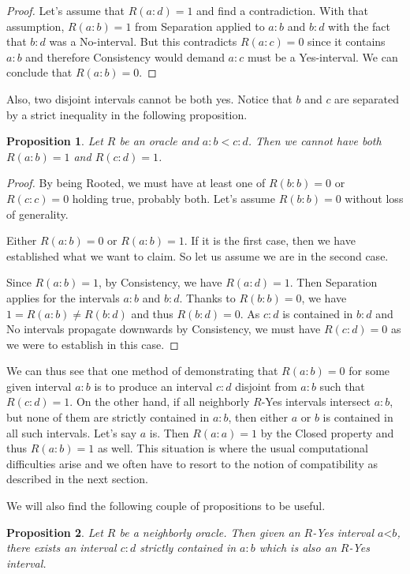 \documentclass[12pt]{article}
\newtheorem{proposition}{Proposition}
\theoremstyle{remark}
\newcommand{\lt}{\mathord{<}}
\begin{document}
\begin{proof}
    Let's assume that $R(a:d) = 1$ and find a contradiction. With that assumption, $R(a:b) = 1$ from Separation applied to $a:b$ and $b:d$ with the fact that $b:d$ was a No-interval. But this contradicts $R(a:c)= 0$ since it contains $a:b$ and therefore Consistency would demand $a:c$ must be a Yes-interval. We can conclude that $R(a:b) =0$.
\end{proof}

Also, two disjoint intervals cannot be both yes. Notice that $b$ and $c$ are separated by a strict inequality in the following proposition. 

\begin{proposition} \label{pr:disjoint}
Let $R$ be an oracle and $a:b < c:d$. Then we cannot have both $R(a:b) = 1$ and $R(c:d) = 1$. 
\end{proposition}

\begin{proof}
By being Rooted, we must have at least one of $R(b:b) = 0$ or $R(c:c) = 0$ holding true, probably both. Let's assume $R(b:b) = 0$ without loss of generality.
 
Either $R(a:b) = 0$ or $R(a:b)=1$. If it is the first case, then we have established what we want to claim. So let us assume we are in the second case. 
 
Since $R(a:b) = 1$,  by Consistency, we have $R(a:d) = 1$. Then Separation applies for the intervals $a:b$ and $b:d$. Thanks to $R(b:b) = 0$, we have $1 = R(a:b) \neq R(b:d)$ and thus $R(b:d) = 0$. As $c:d$ is contained in $b:d$ and No intervals propagate downwards by Consistency, we must have $R(c:d)=0$  as we were to establish in this case. 
\end{proof}

We can thus see that one method of demonstrating that $R(a:b)=0$ for some given interval $a:b$ is to produce an interval $c:d$ disjoint from $a:b$ such that $R(c:d)=1$. On the other hand, if all neighborly $R$-Yes intervals intersect $a:b$, but none of them are strictly contained in $a:b$, then either $a$ or $b$ is contained in all such intervals. Let's say $a$ is. Then $R(a:a)=1$ by the Closed property and thus $R(a:b)=1$ as well. This situation is where the usual computational difficulties arise and we often have to resort to the notion of compatibility as described in the next section. 

We will also find the following couple of propositions to be useful. 

\begin{proposition}\label{pr:subinter}
Let $R$ be a neighborly oracle. Then given an $R$-Yes interval $a\lt b$, there exists an interval $c:d$ strictly contained in $a:b$ which is also an $R$-Yes interval. 
\end{proposition}
\end{document}
